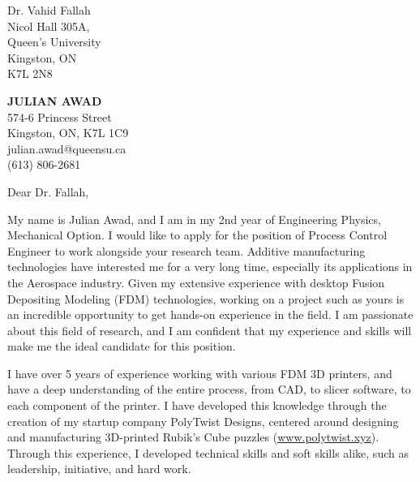 \documentclass[11pt]{letter} %
\begin{document}
\begin{letter}{Dr. Vahid Fallah \\
Nicol Hall 305A, \\
Queen's University \\
Kingston, ON \\
K7L 2N8}

\begin{center}
\textbf{\huge JULIAN AWAD} \\ %
\vspace{1em} %
574-6 Princess Street \\ Kingston, ON, K7L 1C9 \\ julian.awad@queensu.ca \\ (613) 806-2681 %
\end{center}
\hspace{0em}
\signature{Julian Awad} %
\vspace{-1in}
\opening{Dear Dr. Fallah,}

My name is Julian Awad, and I am in my 2nd year of Engineering Physics, Mechanical Option. I would like to apply for the position of Process Control Engineer to work alongside your research team. Additive manufacturing technologies have interested me for a very long time, especially its applications in the Aerospace industry. Given my extensive experience with desktop Fusion Depositing Modeling (FDM) technologies, working on a project such as yours is an incredible opportunity to get hands-on experience in the field. I am passionate about this field of research, and I am confident that my experience and skills will make me the ideal candidate for this position.

I have over 5 years of experience working with various FDM 3D printers, and have a deep understanding of the entire process, from CAD, to slicer software, to each component of the printer. I have developed this knowledge through the creation of my startup company PolyTwist Designs, centered around designing and manufacturing 3D-printed Rubik's Cube puzzles (\url{www.polytwist.xyz}). Through this experience, I developed technical skills and soft skills alike, such as leadership, initiative, and hard work.


\end{letter}
\end{document}
